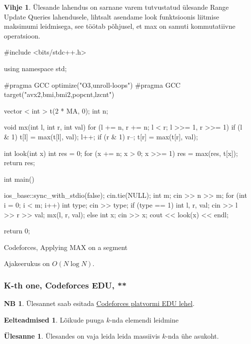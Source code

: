 \documentclass{trkut}
\theoremstyle{definition}
\newtheorem*{prereq}{Eelteadmised}
\newtheorem*{extra}{NB}
\newtheorem*{vihje}{Vihje}
\newtheorem*{Text}{Ülesanne}
\begin{document}
\begin{vihje}
Ülesande lahendus on sarnane varem tutvustatud ülesande Range Update Queries lahendusele, lihtsalt asendame look funktsioonis liitmise maksimumi leidmisega, see töötab põhjusel, et max on samuti kommutatiivne operatsioon.
\end{vihje}

\begin{cclol}
#include <bits/stdc++.h>

using namespace std;

#pragma GCC optimize("O3,unroll-loops")
#pragma GCC target("avx2,bmi,bmi2,popcnt,lzcnt")

vector < int > t(2 * MA, 0);
int n;

void mx(int l, int r, int val) {
  for (l += n, r += n; l < r; l >>= 1, r >>= 1) {
    if (l & 1) {
      t[l] = max(t[l], val);
      l++;
    }
    if (r & 1) {
      r--;
      t[r] = max(t[r], val);
    }
  }
}

int look(int x) {
  int res = 0;
  for (x += n; x > 0; x >>= 1) res = max(res, t[x]);
  return res;
}

int main() {
  ios_base::sync_with_stdio(false);
  cin.tie(NULL);
  int m;
  cin >> n >> m;
  for (int i = 0; i < m; i++) {
    int type;
    cin >> type;
    if (type == 1) {
      int l, r, val;
      cin >> l >> r >> val;
      mx(l, r, val);
    } else {
      int x;
      cin >> x;
      cout << look(x) << endl;
    }
  }

  return 0;
}
    \end{cclol}
    \begin{kk}[H]
    \caption{Codeforces, Applying MAX on a segment}%
    \end{kk}

Ajakeerukus on $O(N\log N)$.


\subsubsection{K-th one, Codeforces EDU, **}
\begin{extra}
Ülesannet saab esitada \href{https://codeforces.com/edu/course/2/lesson/4/2/practice/contest/273278/problem/B}{Codeforces platvormi EDU lehel}.
\end{extra}
\begin{prereq}
Lõikude puuga $k$-nda elemendi leidmine
\end{prereq}
\begin{Text}
Ülesandes on vaja leida leida massiivis $k$-nda ühe asukoht.

\parencite{14}
\end{Text}
\end{document}
